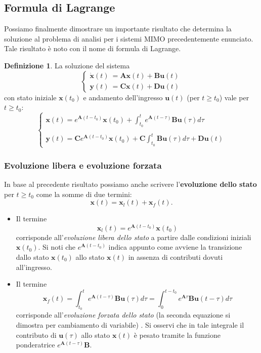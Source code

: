 \documentclass[a4paper]{article}
\renewcommand{\vec}{\bm}
\theoremstyle{definition}
\newtheorem{defn}{Definizione}[subsection]
\begin{document}
	\subsection{Formula di Lagrange}
		Possiamo finalmente dimostrare un importante risultato che determina la soluzione
		al problema di analisi per i sistemi MIMO precedentemente enunciato. Tale risultato
		è noto con il nome di formula di Lagrange.
		\begin{defn}
			La soluzione del sistema 
			\[
			\begin{cases}
			\vec{\dot{x}}(t)\ =\vec{A}\vec{x}(t)+ \vec{B}\vec{u}(t)  \\
			\vec{y}(t)\ =\vec{C}\vec{x}(t)+ \vec{D}\vec{u}(t) 
			\end{cases}
			\]
			con stato iniziale $ \vec{x}(t_0) $ e andamento dell'ingresso $ \vec{u}(t) $ (per $ t\geq t_0 $) vale per $ t\geq t_0 $:
			\[
				\begin{cases}
					\vec{x}(t) = e^{\vec{A}(t - t_0)}\vec{x}(t_0) + 
					\displaystyle\int_{t_0}^{t} e^{\vec{A}(t-\tau)}\vec{B}\vec{u}(\tau)d\tau \\ \\
					\vec{y}(t) = \vec{C}e^{\vec{A}(t - t_0)}\vec{x}(t_0) + 
					\vec{C}\displaystyle\int_{t_0}^{t} \vec{B}\vec{u}(\tau)d\tau + \vec{D}\vec{u}(t)
				\end{cases}
			\]
		\end{defn}
		
		
		\subsubsection{Evoluzione libera e evoluzione forzata}
			In base al precedente risultato possiamo anche scrivere l'\textbf{evoluzione dello stato} per $ t\geq t_0 $
			come la somme di due termini:
			\[
				\vec{x}(t) = \vec{x}_l(t) + \vec{x}_f(t).
			\]
			\begin{itemize}
				\item Il termine 
				\[
					\vec{x}_l(t) = e^{\vec{A}(t-t_0)}\vec{x}(t_0)
				\]
				corrisponde all'\textit{evoluzione libera dello stato} a partire dalle condizioni iniziali $ \vec{x}(t_0) $. Si noti che $ e^{\vec{A}(t-t_0)} $ indica appunto come avviene la transizione dallo stato $ \vec{x}(t_0) $ allo stato $ \vec{x}(t) $ in assenza di contributi dovuti all'ingresso.
				\item Il termine
				\[
					\vec{x}_f(t) = \int_{t_0}^{t} e^{\vec{A}(t - \tau)}\vec{B}\vec{u}(\tau)d\tau =
					\int_{0}^{t-t_0} e^{\vec{A}\tau}\vec{B}\vec{u}(t - \tau)d\tau
				\]
				corrisponde all'\textit{evoluzione forzata dello stato} (la seconda equazione si dimostra
				per cambiamento di variabile) . Si osservi che in tale integrale il contributo di 
				$ \vec{u}(\tau) $ allo stato $ \vec{x}(t) $ è pesato tramite la funzione ponderatrice 
				$ e^{\vec{A}(t - \tau)}\vec{B} $.
			\end{itemize}
			
\end{document}
